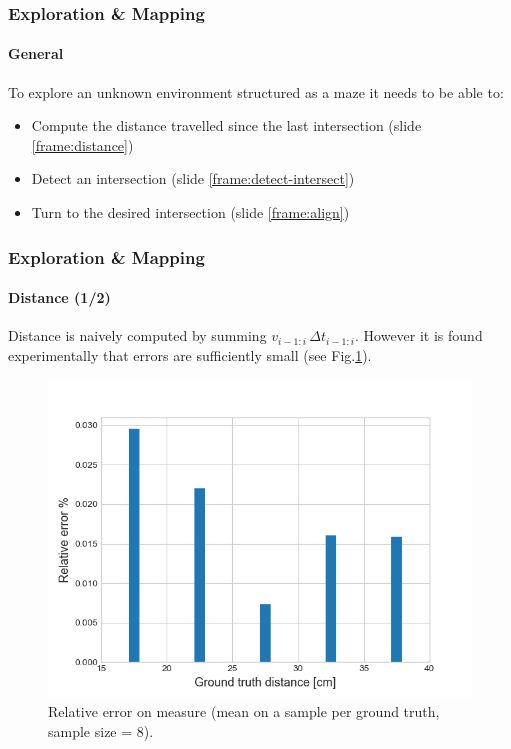 \documentclass[10pt]{beamer}
\begin{document}
\begin{frame}
\frametitle{Exploration \& Mapping}
\framesubtitle{General}
To explore an unknown environment structured as a maze it needs to be able to:
\begin{itemize}
\item Compute the distance travelled since the last intersection (slide \ref{frame:distance})
\item Detect an intersection (slide \ref{frame:detect-intersect})
\item Turn to the desired intersection (slide \ref{frame:align})
\end{itemize}
\end{frame}


\begin{frame}[label={frame:distance}]
\frametitle{Exploration \& Mapping}
\framesubtitle{Distance (1/2)}
Distance is naively computed by summing $v_{i-1:i}\,\Delta t_{i-1:i}$. However it is found experimentally that errors are sufficiently small (see Fig.\ref{fig:hist-dist}).
\begin{figure}[hbtp]
\centering
\includegraphics[scale=0.45]{figures/hist-distance.png}
\caption{Relative error on measure (mean on a sample per ground truth, sample size = 8).}
\label{fig:hist-dist}
\end{figure}
\end{frame}

\end{document}
